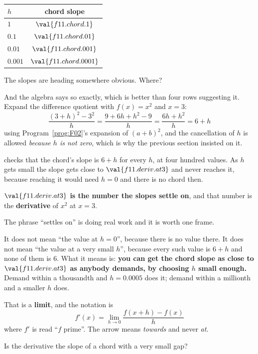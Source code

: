 \begin{fr}
\begin{ansblock}
\begin{center}
\begin{tabular}{lc}
\toprule
$h$ & chord slope \\
\midrule
$1$ & $\val{f11.chord.1}$ \\
$\num{0.1}$ & $\val{f11.chord.01}$ \\
$\num{0.01}$ & $\val{f11.chord.001}$ \\
$\num{0.001}$ & $\val{f11.chord.0001}$ \\
\bottomrule
\end{tabular}
\end{center}
\end{ansblock}

The slopes are heading somewhere obvious. Where?
\nextframe
\end{fr}

\begin{fr}
And the algebra says so exactly, which is better than four rows suggesting it.
Expand the difference quotient with $f(x) = x^{2}$ and $x = 3$:
\[ \frac{(3+h)^{2} - 3^{2}}{h} = \frac{9 + 6h + h^{2} - 9}{h}
   = \frac{6h + h^{2}}{h} = 6 + h \]
using Program~\ref{prog:F02}'s expansion of $(a+b)^{2}$, and the cancellation
of $h$ is allowed \emph{because $h$ is not zero}, which is why the previous
section insisted on it.

 checks that the chord's slope is $6 + h$ for
every $h$, at four hundred values. As $h$ gets small the slope gets close to
$\val{f11.deriv.at3}$ and never reaches it, because reaching it would need
$h = 0$ and there is no chord then.

\textbf{$\val{f11.deriv.at3}$ is the number the slopes settle on}, and that
number is the \textbf{derivative} of $x^{2}$ at $x = 3$.
\end{fr}

\begin{fr}
The phrase \enquote{settles on} is doing real work and it is worth one frame.

It does not mean \enquote{the value at $h = 0$}, because there is no value
there. It does not mean \enquote{the value at a very small $h$}, because every
such value is $6 + h$ and none of them is $6$. What it means is: \textbf{you can get the chord slope as close to
$\val{f11.deriv.at3}$ as anybody demands, by choosing $h$ small enough.} Demand within a thousandth and $h = \num{0.0005}$
does it; demand within a millionth and a smaller $h$ does.

That is a \textbf{limit}, and the notation is
\[ f'(x) = \lim_{h \to 0} \frac{f(x + h) - f(x)}{h} \]
where $f'$ is read \enquote{$f$ prime}. The arrow means \emph{towards} and
never \emph{at}.

Is the derivative the slope of a chord with a very small gap?
\nextframe
\end{fr}

